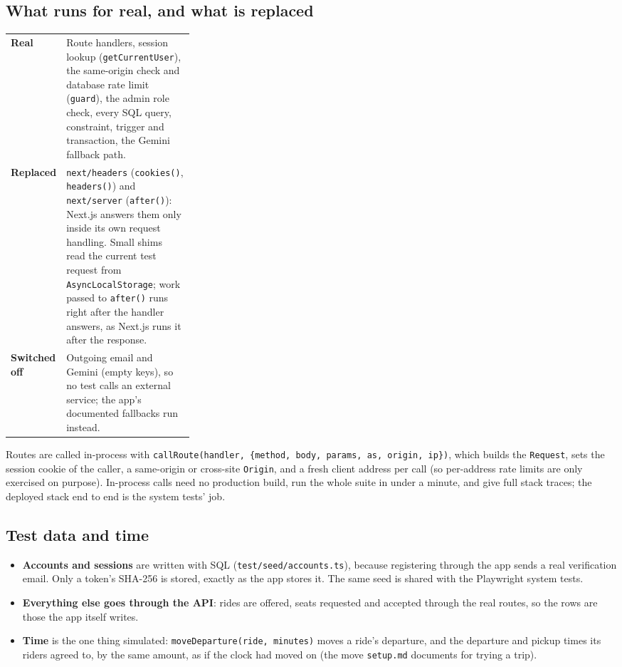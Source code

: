 \documentclass[10pt]{article}
\begin{document}
\subsection{What runs for real, and what is replaced}
\begin{tabularx}{\linewidth}{@{}>{\raggedright\arraybackslash}p{0.3\linewidth}X@{}}
\toprule
\textbf{Real} & Route handlers, session lookup (\texttt{getCurrentUser}), the same-origin check
and database rate limit (\texttt{guard}), the admin role check, every SQL query, constraint,
trigger and transaction, the Gemini fallback path. \\
\textbf{Replaced} & \texttt{next/headers} (\texttt{cookies()}, \texttt{headers()}) and
\texttt{next/server} (\texttt{after()}): Next.js answers them only inside its own request
handling. Small shims read the current test request from \texttt{AsyncLocalStorage}; work passed
to \texttt{after()} runs right after the handler answers, as Next.js runs it after the response. \\
\textbf{Switched off} & Outgoing email and Gemini (empty keys), so no test calls an external
service; the app's documented fallbacks run instead. \\
\bottomrule
\end{tabularx}

Routes are called in-process with \texttt{callRoute(handler, \{method, body, params, as,
origin, ip\})}, which builds the \texttt{Request}, sets the session cookie of the caller, a
same-origin or cross-site \texttt{Origin}, and a fresh client address per call (so per-address
rate limits are only exercised on purpose). In-process calls need no production build, run the
whole suite in under a minute, and give full stack traces; the deployed stack end to end is the
system tests' job.

\subsection{Test data and time}
\begin{itemize}
  \item \textbf{Accounts and sessions} are written with SQL (\texttt{test/seed/accounts.ts}),
    because registering through the app sends a real verification email. Only a token's SHA-256
    is stored, exactly as the app stores it. The same seed is shared with the Playwright system
    tests.
  \item \textbf{Everything else goes through the API}: rides are offered, seats requested and
    accepted through the real routes, so the rows are those the app itself writes.
  \item \textbf{Time} is the one thing simulated: \texttt{moveDeparture(ride, minutes)} moves a
    ride's departure, and the departure and pickup times its riders agreed to, by the same
    amount, as if the clock had moved on (the move \texttt{setup.md} documents for trying a trip).
\end{itemize}
\end{document}
